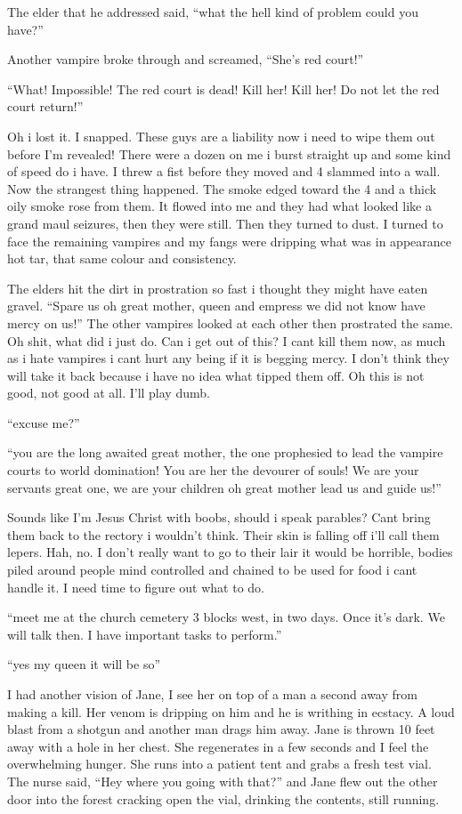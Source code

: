 The elder that he addressed said, ``what the hell kind of problem could you have?'' 

Another vampire broke through and screamed, ``She's red court!''

``What! Impossible! The red court is dead! Kill her! Kill her! Do not let the red court return!''

Oh i lost it. I snapped. These guys are a liability now i need to wipe them out before I'm revealed! There were a dozen on me i burst straight up and some kind of speed do i have. I threw a fist before they moved and 4 slammed into a wall. Now the strangest thing happened. The smoke edged toward the 4 and a thick oily smoke rose from them. It flowed into me and they had what looked like a grand maul seizures, then they were still. Then they turned to dust. I turned to face the remaining vampires and my fangs were dripping what was in appearance hot tar, that same colour and consistency.

The elders hit the dirt in prostration so fast i thought they might have eaten gravel. ``Spare us oh great mother, queen and empress we did not know have mercy on us!'' The other vampires looked at each other then prostrated the same. Oh shit, what did i just do. Can i get out of this? I cant kill them now, as much as i hate vampires i cant hurt any being if it is begging mercy. I don't think they will take it back because i have no idea what tipped them off. Oh this is not good, not good at all. I'll play dumb.

``excuse me?''

``you are the long awaited great mother, the one prophesied to lead the vampire courts to world domination! You are her the devourer of souls! We are your servants great one, we are your children oh great mother lead us and guide us!''

Sounds like I'm Jesus Christ with boobs, should i speak parables? Cant bring them back to the rectory i wouldn't think. Their skin is falling off i'll call them lepers. Hah, no. I don't really want to go to their lair it would be horrible, bodies piled around people mind controlled and chained to be used for food i cant handle it. I need time to figure out what to do.

``meet me at the church cemetery 3 blocks west, in two days. Once it's dark. We will talk then. I have important tasks to perform.''

``yes my queen it will be so''

I had another vision of Jane, I see her on top of a man a second away from making a kill. Her venom is dripping on him and he is writhing in ecstacy. A loud blast from a shotgun and another man drags him away. Jane is thrown 10 feet away with a hole in her chest. She regenerates in a few seconds and I feel the overwhelming hunger. She runs into a patient tent and grabs a fresh test vial. The nurse said, ``Hey where you going with that?'' and Jane flew out the other door into the forest cracking open the vial, drinking the contents, still running.

